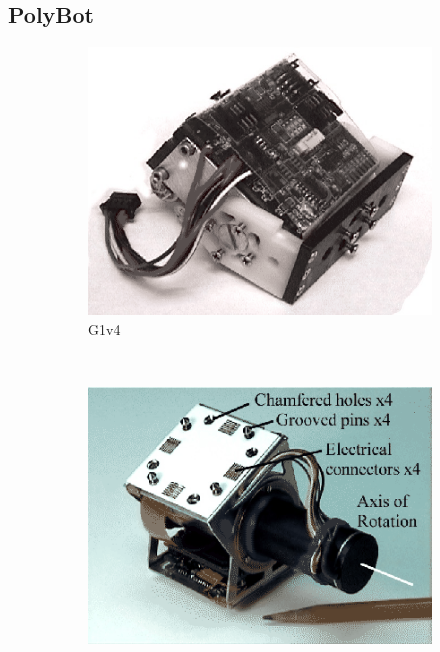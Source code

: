 \subsection{PolyBot}
\label{state_modules_PolyBot}

\begin{figure}
        \centering
        \begin{subfigure}[b]{0.3\textwidth}
                \centering
                \includegraphics[width=\textwidth]{images/PolyBot_G1v4.png}
                \caption{G1v4}
                \label{fig:G1v4}
        \end{subfigure}%
        ~ 
        \begin{subfigure}[b]{0.3\textwidth}
                \centering
               	\includegraphics[width=\textwidth]{images/PolyBot_G2.png}

\end{subfigure}
\end{figure}
